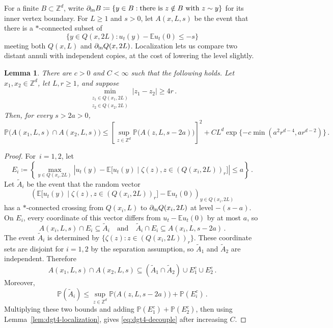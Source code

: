 \documentclass[11pt]{amsart}
\theoremstyle{plain}
\newtheorem{lemma}[theorem]{Lemma}
\theoremstyle{definition}
\newcommand{\Z}{\mathbb{Z}}
\newcommand{\E}{\mathbb{E}}
\renewcommand{\P}{\mathbb{P}}
\begin{document}
		For a finite $B\subset\Z^d$, write
		$\partial_{\rm in}B\coloneqq\{y\in B:\text{there is }z\notin B\text{ with }z\sim y\}$
		for its inner vertex boundary. For $L\geq1$ and $s>0$, let $A(x,L,s)$
		be the event that there is a
		$\ast$-connected subset of
		\[
			\{y\in Q(x,2L):u_t(y)-\E u_t(0)\leq -s\}
		\]
		meeting both $Q(x,L)$ and $\partial_{\rm in}Q(x,2L)$. Localization lets us
		compare two distant annuli with independent copies, at the cost of
		lowering the level slightly.
	\begin{lemma}\label{lem:dgt4-level-shift-decoupling}
		There are $c>0$ and $C<\infty$ such that the following holds. Let
		$x_1,x_2\in\Z^d$, let $L,r\geq1$, and suppose
		\[
			\min_{\substack{z_1\in Q(x_1,2L)\\ z_2\in Q(x_2,2L)}} |z_1-z_2|
			\geq4r\, .
		\]
		Then, for every $s>2a>0$,
		\begin{equation}
			\P\bigl(A(x_1,L,s)\cap A(x_2,L,s)\bigr)\leq
			\left[\sup_{z\in\Z^d}\P\bigl(A(z,L,s-2a)\bigr)\right]^2
			+CL^d\exp\{-c\min(a^2r^{d-4}, ar^{d-2})\}\, .
			\label{eq:dgt4-decouple}
		\end{equation}
		\end{lemma}
		\begin{proof}
			For~$i = 1,2$, let
			\[
				E_i\coloneqq
				\left\{
				\max_{y\in Q(x_i,2L)}
				\left|
				u_t(y)
				-
				\E\bigl[u_t(y)\mid \zeta(z), z\in (Q(x_i,2L))_r\bigr]
				\right|
				\leq a
				\right\}\, .
			\]
			Let
			$\widetilde A_i$ be the event that the random vector
			\[
				\left(
				\E\bigl[u_t(y)\mid \zeta(z), z\in (Q(x_i,2L))_r\bigr]
				-\E u_t(0)
				\right)_{y\in Q(x_i,2L)}
			\]
			has a $\ast$-connected crossing from $Q(x_i,L)$ to
			$\partial_{\rm in}Q(x_i,2L)$ at level $-(s-a)$. On $E_i$, every coordinate
			of this vector differs from $u_t-\E u_t(0)$ by at most $a$, so
			\[
				A(x_i,L,s)\cap E_i\subseteq \widetilde A_i
				\quad\text{and}\quad
				\widetilde A_i\cap E_i\subseteq A(x_i,L,s-2a)\, .
			\]
			The event $\widetilde A_i$ is determined by
			$\{\zeta(z):z\in (Q(x_i,2L))_r\}$. These coordinate sets are
			disjoint for $i=1,2$ by the separation assumption, so
			$\widetilde A_1$ and $\widetilde A_2$ are independent. Therefore
			\[
				A(x_1,L,s)\cap A(x_2,L,s)
				\subseteq
				(\widetilde A_1\cap\widetilde A_2)\cup E_1^c\cup E_2^c\, .
			\]
			Moreover,
			\[
				\P(\widetilde A_i)
				\leq
				\sup_{z\in\Z^d}\P\bigl(A(z,L,s-2a)\bigr)
				+\P(E_i^c)\, .
			\]
			Multiplying these two bounds and adding
			$\P(E_1^c)+\P(E_2^c)$, then using
			Lemma~\ref{lem:dgt4-localization}, gives \eqref{eq:dgt4-decouple}
			after increasing $C$.
		\end{proof}
\end{document}
